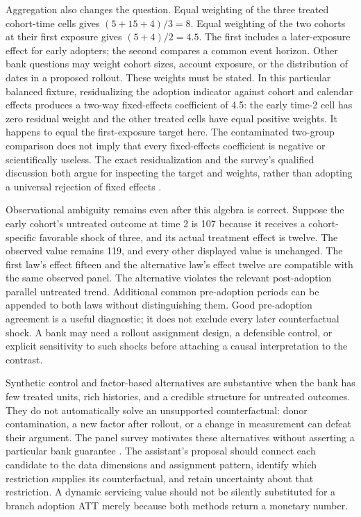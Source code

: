 Aggregation also changes the question. Equal weighting of the three treated
cohort-time cells gives $(5+15+4)/3=8$. Equal weighting of the two cohorts at
their first exposure gives $(5+4)/2=4.5$. The first includes a later-exposure
effect for early adopters; the second compares a common event horizon. Other
bank questions may weight cohort sizes, account exposure, or the distribution
of dates in a proposed rollout. These weights must be stated. In this particular
balanced fixture, residualizing the adoption indicator against cohort and
calendar effects produces a two-way fixed-effects coefficient of 4.5: the
early time-2 cell has zero residual weight and the other treated cells have
equal positive weights. It happens to equal the first-exposure target here.
The contaminated two-group comparison does not imply that every fixed-effects
coefficient is negative or scientifically useless. The exact residualization
and the survey's qualified discussion both argue for inspecting the target and
weights, rather than adopting a universal rejection of fixed effects
\cite{panelreview2024,exec14_workflow_oracle}.

Observational ambiguity remains even after this algebra is correct. Suppose
the early cohort's untreated outcome at time 2 is 107 because it receives a
cohort-specific favorable shock of three, and its actual treatment effect
is twelve. The observed value remains 119, and every other displayed value is
unchanged. The first law's effect fifteen and the alternative law's effect
twelve are compatible with the same observed panel. The alternative violates
the relevant post-adoption parallel untreated trend. Additional common
pre-adoption periods can be appended to both laws without distinguishing
them. Good pre-adoption agreement is a useful diagnostic; it does not exclude
every later counterfactual shock. A bank may need a rollout assignment design,
a defensible control, or explicit sensitivity to such shocks before attaching
a causal interpretation to the contrast.

Synthetic control and factor-based alternatives are substantive when the
bank has few treated units, rich histories, and a credible structure for
untreated outcomes. They do not automatically solve an unsupported
counterfactual: donor contamination, a new factor after rollout, or a change
in measurement can defeat their argument. The panel survey motivates these
alternatives without asserting a particular bank guarantee
\cite{panelreview2024}. The assistant's proposal should connect each candidate
to the data dimensions and assignment pattern, identify which restriction
supplies its counterfactual, and retain uncertainty about that restriction.
A dynamic servicing value should not be silently substituted for a branch
adoption ATT merely because both methods return a monetary number.

